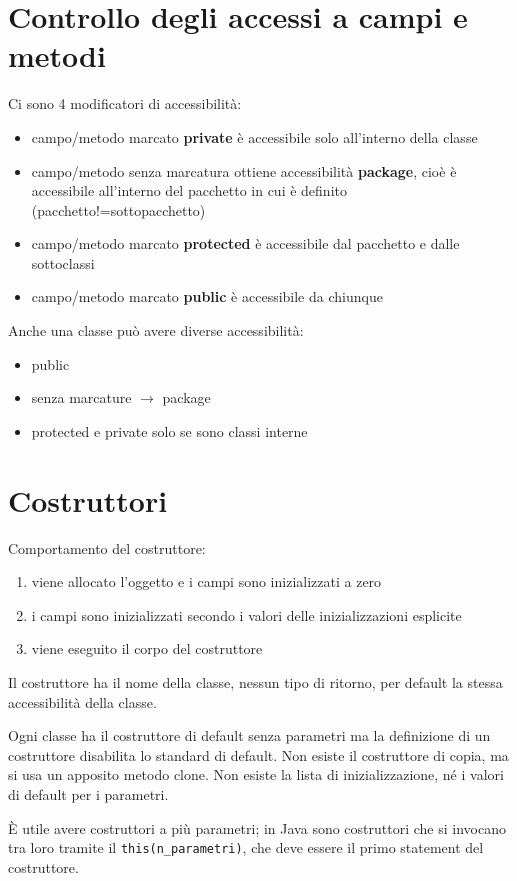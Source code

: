 \section{Controllo degli accessi a campi e metodi}
Ci sono 4 modificatori di accessibilità:
\begin{itemize}
\item campo/metodo marcato \textbf{private} è accessibile solo all'interno della classe
\item campo/metodo senza marcatura ottiene accessibilità \textbf{package}, cioè è accessibile all'interno del pacchetto in cui è definito (pacchetto!=sottopacchetto)
\item campo/metodo marcato \textbf{protected} è accessibile dal pacchetto e dalle sottoclassi
\item campo/metodo marcato \textbf{public} è accessibile da chiunque
\end{itemize}
Anche una classe può avere diverse accessibilità:
\begin{itemize}
\item public
\item senza marcature $\rightarrow$ package
\item protected e private solo se sono classi interne
\end{itemize}

\section{Costruttori}
Comportamento del costruttore:
\begin{enumerate}
\item viene allocato l'oggetto e i campi sono inizializzati a zero
\item i campi sono inizializzati secondo i valori delle inizializzazioni esplicite
\item viene eseguito il corpo del costruttore
\end{enumerate}
Il costruttore ha il nome della classe, nessun tipo di ritorno, per default la stessa accessibilità della classe.

Ogni classe ha il costruttore di default senza parametri ma la definizione di un costruttore disabilita lo standard di default.
Non esiste il costruttore di copia, ma si usa un apposito metodo clone.
Non esiste la lista di inizializzazione, né i valori di default per i parametri.

È utile avere costruttori a più parametri; in Java sono costruttori che si invocano tra loro tramite il \texttt{this(n\_parametri)}, che deve essere il primo statement del costruttore.

